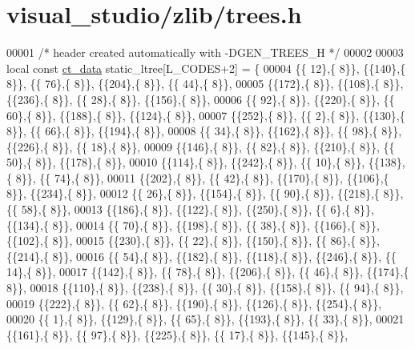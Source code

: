 \hypertarget{visual__studio_2zlib_2trees_8h_source}{}\section{visual\+\_\+studio/zlib/trees.h}
\label{visual__studio_2zlib_2trees_8h_source}

\begin{DoxyCode}
00001 \textcolor{comment}{/* header created automatically with -DGEN\_TREES\_H */}
00002 
00003 local \textcolor{keyword}{const} \hyperlink{structct__data__s}{ct\_data} static\_ltree[L\_CODES+2] = \{
00004 \{\{ 12\},\{  8\}\}, \{\{140\},\{  8\}\}, \{\{ 76\},\{  8\}\}, \{\{204\},\{  8\}\}, \{\{ 44\},\{  8\}\},
00005 \{\{172\},\{  8\}\}, \{\{108\},\{  8\}\}, \{\{236\},\{  8\}\}, \{\{ 28\},\{  8\}\}, \{\{156\},\{  8\}\},
00006 \{\{ 92\},\{  8\}\}, \{\{220\},\{  8\}\}, \{\{ 60\},\{  8\}\}, \{\{188\},\{  8\}\}, \{\{124\},\{  8\}\},
00007 \{\{252\},\{  8\}\}, \{\{  2\},\{  8\}\}, \{\{130\},\{  8\}\}, \{\{ 66\},\{  8\}\}, \{\{194\},\{  8\}\},
00008 \{\{ 34\},\{  8\}\}, \{\{162\},\{  8\}\}, \{\{ 98\},\{  8\}\}, \{\{226\},\{  8\}\}, \{\{ 18\},\{  8\}\},
00009 \{\{146\},\{  8\}\}, \{\{ 82\},\{  8\}\}, \{\{210\},\{  8\}\}, \{\{ 50\},\{  8\}\}, \{\{178\},\{  8\}\},
00010 \{\{114\},\{  8\}\}, \{\{242\},\{  8\}\}, \{\{ 10\},\{  8\}\}, \{\{138\},\{  8\}\}, \{\{ 74\},\{  8\}\},
00011 \{\{202\},\{  8\}\}, \{\{ 42\},\{  8\}\}, \{\{170\},\{  8\}\}, \{\{106\},\{  8\}\}, \{\{234\},\{  8\}\},
00012 \{\{ 26\},\{  8\}\}, \{\{154\},\{  8\}\}, \{\{ 90\},\{  8\}\}, \{\{218\},\{  8\}\}, \{\{ 58\},\{  8\}\},
00013 \{\{186\},\{  8\}\}, \{\{122\},\{  8\}\}, \{\{250\},\{  8\}\}, \{\{  6\},\{  8\}\}, \{\{134\},\{  8\}\},
00014 \{\{ 70\},\{  8\}\}, \{\{198\},\{  8\}\}, \{\{ 38\},\{  8\}\}, \{\{166\},\{  8\}\}, \{\{102\},\{  8\}\},
00015 \{\{230\},\{  8\}\}, \{\{ 22\},\{  8\}\}, \{\{150\},\{  8\}\}, \{\{ 86\},\{  8\}\}, \{\{214\},\{  8\}\},
00016 \{\{ 54\},\{  8\}\}, \{\{182\},\{  8\}\}, \{\{118\},\{  8\}\}, \{\{246\},\{  8\}\}, \{\{ 14\},\{  8\}\},
00017 \{\{142\},\{  8\}\}, \{\{ 78\},\{  8\}\}, \{\{206\},\{  8\}\}, \{\{ 46\},\{  8\}\}, \{\{174\},\{  8\}\},
00018 \{\{110\},\{  8\}\}, \{\{238\},\{  8\}\}, \{\{ 30\},\{  8\}\}, \{\{158\},\{  8\}\}, \{\{ 94\},\{  8\}\},
00019 \{\{222\},\{  8\}\}, \{\{ 62\},\{  8\}\}, \{\{190\},\{  8\}\}, \{\{126\},\{  8\}\}, \{\{254\},\{  8\}\},
00020 \{\{  1\},\{  8\}\}, \{\{129\},\{  8\}\}, \{\{ 65\},\{  8\}\}, \{\{193\},\{  8\}\}, \{\{ 33\},\{  8\}\},
00021 \{\{161\},\{  8\}\}, \{\{ 97\},\{  8\}\}, \{\{225\},\{  8\}\}, \{\{ 17\},\{  8\}\}, \{\{145\},\{  8\}\},

\end{DoxyCode}
